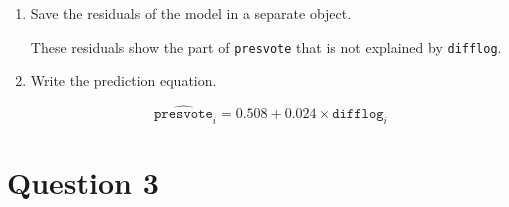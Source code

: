 \documentclass[12pt,letterpaper]{article}
\begin{document}
\begin{enumerate}
		\item Save the residuals of the model in a separate object.
		
		
		
		
		
		\noindent These residuals show the part of \texttt{presvote} that is not explained by \texttt{difflog}.
		
		\item Write the prediction equation.
		
		\[
		\widehat{\texttt{presvote}}_i = 0.508 + 0.024 \times \texttt{difflog}_i
		\]
	\end{enumerate}
	
	\section*{Question 3}
	
\end{document}
